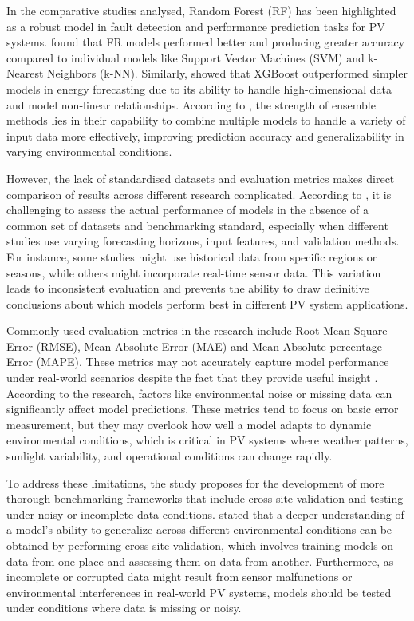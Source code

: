 In the comparative studies analysed, Random Forest (RF) has been highlighted as a robust model in fault detection and performance prediction tasks for PV systems. \parencite{Zhang et al._2020} found that FR models performed better and producing greater accuracy compared to individual models like Support Vector Machines (SVM) and k-Nearest Neighbors (k-NN). Similarly, \parencite{Siddiqui et al._2020} showed that XGBoost outperformed simpler models in energy forecasting due to its ability to handle high-dimensional data and model non-linear relationships. According to \parencite{Kumar et al._2020}, the strength of ensemble methods lies in their capability to combine multiple models to handle a variety of input data more effectively, improving prediction accuracy and generalizability in varying environmental conditions.

However, the lack of standardised datasets and evaluation metrics makes direct comparison of results across different research complicated. According to \parencite{De Silva et al._2024}, it is challenging to assess the actual performance of models in the absence of a common set of datasets and benchmarking standard, especially when different studies use varying forecasting horizons, input features, and validation methods. For instance, some studies might use historical data from specific regions or seasons, while others might incorporate real-time sensor data. This variation leads to inconsistent evaluation and prevents the ability to draw definitive conclusions about which models perform best in different PV system applications.

Commonly used evaluation metrics in the research include Root Mean Square Error (RMSE), Mean Absolute Error (MAE) and Mean Absolute percentage Error (MAPE). These metrics may not accurately capture model performance under real-world scenarios despite the fact that they provide useful insight \parencite{De Silva et al._2024}. According to the research, factors like environmental noise or missing data can significantly affect model predictions. These metrics tend to focus on basic error measurement, but they may overlook how well a model adapts to dynamic environmental conditions, which is critical in PV systems where weather patterns, sunlight variability, and operational conditions can change rapidly. 

To address these limitations, the study proposes for the development of more thorough benchmarking frameworks that include cross-site validation and testing under noisy or incomplete data conditions. \parencite{Zhang et al._2020} stated that a deeper understanding of a model’s ability to generalize across different environmental conditions can be obtained by performing cross-site validation, which involves training models on data from one place and assessing them on data from another. Furthermore, as incomplete or corrupted data might result from sensor malfunctions or environmental interferences in real-world PV systems, models should be tested under conditions where data is missing or noisy.

